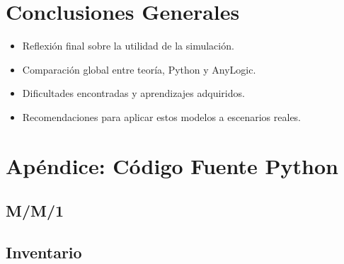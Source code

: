 \documentclass[12pt]{article}
\begin{document}
\section{Conclusiones Generales}

\begin{itemize}
    \item Reflexión final sobre la utilidad de la simulación.
    \item Comparación global entre teoría, Python y AnyLogic.
    \item Dificultades encontradas y aprendizajes adquiridos.
    \item Recomendaciones para aplicar estos modelos a escenarios reales.
\end{itemize}

\appendix
\section{Apéndice: Código Fuente Python}
\subsection*{M/M/1}


\subsection*{Inventario}

\end{document}
